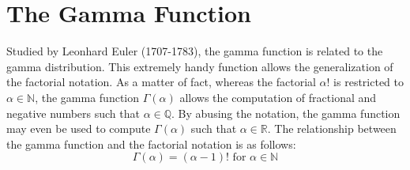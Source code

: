 \documentclass[12pt]{article}
\begin{document}
\pagebreak
\section{The Gamma Function}
\vspace*{-6pt}
Studied by Leonhard Euler (1707-1783), the gamma function is related to the gamma distribution. This extremely handy
function allows the generalization of the factorial notation. As a matter of fact, whereas the factorial $\alpha!$ is
restricted to $\alpha\in\mathbb{N}$, the gamma function $\Gamma(\alpha)$ allows the computation of fractional and
negative numbers such that $\alpha\in\mathbb{Q}$. By abusing the notation, the gamma function may even be used to
compute $\Gamma(\alpha)$ such that $\alpha\in\mathbb{R}$. The relationship between the gamma function and the factorial
notation is as follows:
\vspace*{-18pt}
\begin{equation}\label{eq:gammafunction:factorial}
	\Gamma(\alpha)=(\alpha-1)!\text{ for }\alpha\in\mathbb{N}
\end{equation}
\vspace*{-60pt}
\end{document}
